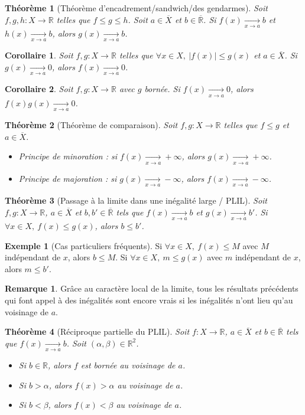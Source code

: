 \documentclass[french]{book}
\newcommand{\R}{\mathbb{R}}
\theoremstyle{plain}
\newtheorem{thm}{Théorème}[chapter]
\newtheorem{cor}{Corollaire}[chapter]
\theoremstyle{definition}
\newtheorem{exa}{Exemple}[chapter]
\newtheorem{rmq}{Remarque}[chapter]
\theoremstyle{remark}
\begin{document}
\begin{thm}[Théorème d'encadrement/sandwich/des gendarmes]
	Soit $f,g,h:X\rightarrow\R$ telles que $f\leqslant g\leqslant h$. Soit $a\in\overline{X}$ et $b\in\overline{\R}$. Si $f(x)\xrightarrow[x\to a]{}b$ et $h(x)\xrightarrow[x\to a]{}b$, alors $g(x)\xrightarrow[x\to a]{}b$.
\end{thm}
\begin{cor}
	Soit $f,g:X\rightarrow\R$ telles que $\forall x\in X,\ \lvert f(x)\rvert\leqslant g(x)$ et $a\in\overline{X}$. Si $g(x)\xrightarrow[x\to a]{}0$, alors $f(x)\xrightarrow[x\to a]{}0$.
\end{cor}
\begin{cor}
	Soit $f,g:X\rightarrow\R$ avec $g$ bornée. Si $f(x)\xrightarrow[x\to a]{}0$, alors $f(x)g(x)\xrightarrow[x\to a]{}0$.
\end{cor}
\begin{thm}[Théorème de comparaison]
	Soit $f,g:X\rightarrow\R$ telles que $f\leqslant g$ et $a\in\overline{X}$.
	\begin{itemize}
		\item Principe de minoration : si $f(x)\xrightarrow[x\to a]{}+\infty$, alors $g(x)\xrightarrow[x\to a]{}+\infty$.
		\item Principe de majoration : si $g(x)\xrightarrow[x\to a]{}-\infty$, alors $f(x)\xrightarrow[x\to a]{}-\infty$.
	\end{itemize}
\end{thm}
\begin{thm}[Passage à la limite dans une inégalité large / PLIL]
	Soit $f,g:X\rightarrow\R$, $a\in\overline{X}$ et $b,b'\in\overline{\R}$ tels que $f(x)\xrightarrow[x\to a]{}b$ et $g(x)\xrightarrow[x\to a]{}b'$. Si $\forall x\in X,\ f(x)\leqslant g(x)$, alors $b\leqslant b'$.
\end{thm}
\begin{exa}[Cas particuliers fréquents]
	Si $\forall x\in X,\ f(x)\leqslant M$ avec $M$ indépendant de $x$, alors $b\leqslant M$. Si $\forall x\in X,\ m\leqslant g(x)$ avec $m$ indépendant de $x$, alors $m\leqslant b'$.
\end{exa}
\begin{rmq}
	Grâce au caractère local de la limite, tous les résultats précédents qui font appel à des inégalités sont encore vrais si les inégalités n'ont lieu qu'au voisinage de $a$.
\end{rmq}
\begin{thm}[Réciproque partielle du PLIL]
	Soit $f:X\rightarrow\R$, $a\in\overline{X}$ et $b\in\overline{\R}$ tels que $f(x)\xrightarrow[x\to a]{}b$. Soit $(\alpha,\beta)\in\R^2$.
	\begin{itemize}
		\item Si $b\in\R$, alors $f$ est bornée au voisinage de $a$.
		\item Si $b>\alpha$, alors $f(x)>\alpha$ au voisinage de $a$.
		\item Si $b<\beta$, alors $f(x)<\beta$ au voisinage de $a$.
	\end{itemize}
\end{thm}
\end{document}
